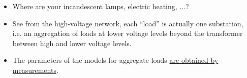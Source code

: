 \documentclass{beamer}
\begin{document}
\begin{frame}
\begin{columns}
\begin{column}{0.5\textwidth}
    \end{column}
    \begin{column}{0.5\textwidth}
  \begin{itemize}
  \item Where are your incandescent lamps, electric heating, ...?
  \item<visible@2-> See from the high-voltage network, each ``load'' is actually one substation, i.e. an aggregation of loads at lower voltage levels beyond the transformer between high and lower voltage levels.
  \item<visible@3> The parameters of the models for aggregate loads \underline{are obtained by measurements}. 
  \end{itemize}      
    \end{column}
  \end{columns}
\end{frame}
\end{document}
